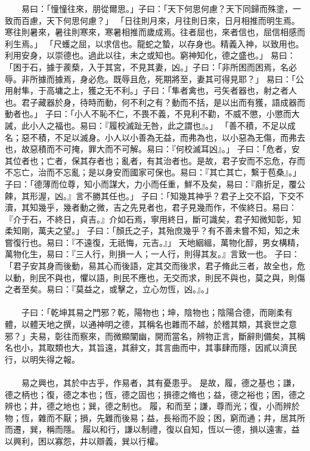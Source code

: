 　　易曰：「憧憧往來，朋從爾思。」子曰：「天下何思何慮？天下同歸而殊塗，一致而百慮，天下何思何慮？」 「日往則月來，月往則日來，日月相推而明生焉。寒往則暑來，暑往則寒來，寒暑相推而歲成焉。往者屈也，來者信也，屈信相感而利生焉。」 「尺蠖之屈，以求信也。龍蛇之蟄，以存身也。精義入神，以致用也。利用安身，以崇德也。過此以往，未之或知也。窮神知化，德之盛也。」 易曰：「困于石，據于蒺蔾，入于其宮，不見其妻，凶。」子曰：「非所困而困焉，名必辱。非所據而據焉，身必危。既辱且危，死期將至，妻其可得見耶？」 易曰：「公用射隼，于高墉之上，獲之无不利。」子曰：「隼者禽也，弓矢者器也，射之者人也。君子藏器於身，待時而動，何不利之有？動而不括，是以出而有獲，語成器而動者也。」 子曰：「小人不恥不仁，不畏不義，不見利不勸，不威不懲，小懲而大誡，此小人之福也。易曰：『履校滅趾无咎，此之謂也』。」 「善不積，不足以成名；惡不積，不足以滅身。小人以小善為无益，而弗為也，以小惡為无傷，而弗去也，故惡積而不可掩，罪大而不可解。易曰：『何校滅耳凶』。」 子曰：「危者，安其位者也；亡者，保其存者也；亂者，有其治者也。是故，君子安而不忘危，存而不忘亡，治而不忘亂；是以身安而國家可保也。易曰：『其亡其亡，繫于苞桑』。」 子曰：「德薄而位尊，知小而謀大，力小而任重，鮮不及矣，易曰：『鼎折足，覆公餗，其形渥，凶。』言不勝其任也。」 子曰：「知幾其神乎？君子上交不諂，下交不瀆，其知幾乎，幾者動之微，吉之先見者也，君子見幾而作，不俟終日。易曰：『介于石，不終日，貞吉。』介如石焉，寧用終日，斷可識矣，君子知微知彰，知柔知剛，萬夫之望。」 子曰：「顏氏之子，其殆庶幾乎？有不善未嘗不知，知之未嘗復行也。易曰：『不遠復，无祇悔，元吉。』」 天地絪縕，萬物化醇，男女構精，萬物化生，易曰：『三人行，則損一人；一人行，則得其友。』言致一也。 子曰：「君子安其身而後動，易其心而後語，定其交而後求，君子脩此三者，故全也，危以動，則民不與也，懼以語，則民不應也，无交而求，則民不與也，莫之與，則傷之者至矣。易曰：『莫益之，或擊之，立心勿恆，凶。』。」 
\\\\
　　子曰：「乾坤其易之門邪？乾，陽物也；坤，陰物也；陰陽合德，而剛柔有體，以體天地之撰，以通神明之德，其稱名也雜而不越，於稽其類，其衰世之意邪？」夫易，彰往而察來，而微顯闡幽，開而當名，辨物正言，斷辭則備矣，其稱名也小，其取類也大，其旨遠，其辭文，其言曲而中，其事肆而隱，因貳以濟民行，以明失得之報。 
\\\\
　　易之興也，其於中古乎，作易者，其有憂患乎。 是故，履，德之基也；謙，德之柄也；復，德之本也；恆，德之固也；損德之脩也；益，德之裕也；困，德之辨也；井，德之地也；巽，德之制也。 履，和而至；謙，尊而光；復，小而辨於物；恆，雜而不厭；損，先難而後易；益，長裕而不設；困，窮而通；井，居其所而遷，巽，稱而隱。 履以和行，謙以制禮，復以自知，恆以一德，損以遠害，益以興利，困以寡怨，井以辯義，巽以行權。 
